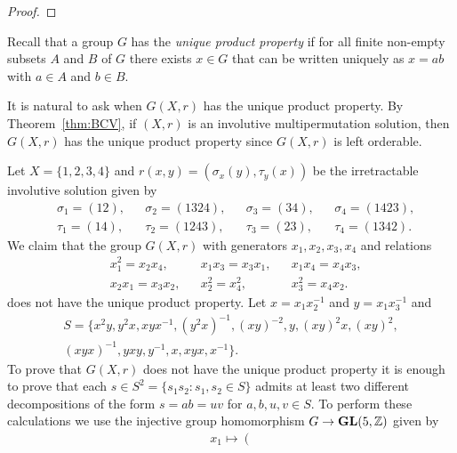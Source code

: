 \begin{proof}

\end{proof}

Recall that a group $G$ has the \emph{unique product property} if 
for all finite non-empty subsets $A$ and $B$ of $G$ there exists $x\in G$ 
that can be written uniquely as $x = ab$ with $a\in A$ and $b\in B$. 

It is natural to ask when $G(X,r)$ has the unique product property. By Theorem~\ref{thm:BCV}, if $(X,r)$ is an involutive
multipermutation solution, then $G(X,r)$ has the unique product property since $G(X,r)$ is left orderable. 

\begin{example}
    \label{pro:4-19}
	Let $X=\{1,2,3,4\}$ and $r(x,y)=(\sigma_x(y),\tau_y(x))$ be the irretractable involutive solution given by 
	\begin{align*}
		&\sigma_1=(12), && \sigma_2=(1324), && \sigma_3=(34), && \sigma_4=(1423),\\
		&\tau_1=(14), &&\tau_2=(1243), && \tau_3=(23), && \tau_4=(1342).
	\end{align*}
	We claim that the group $G(X,r)$ with 
	generators
	$x_1,x_2,x_3,x_4$ and relations
	\begin{align*}
		& x_1^2=x_2x_4,
		&& x_1x_3=x_3x_1,
		&& x_1x_4=x_4x_3,\\
		& x_2x_1=x_3x_2,
		&& x_2^2=x_4^2,
		&& x_3^2=x_4x_2.
	\end{align*}
	does not have the unique product property. Let $x=x_1x_2^{-1}$ and $y=x_1x_3^{-1}$ and 
    \begin{multline}
    \label{eq:Promislow}
    S=\{ x^2y,
    y^2x,
    xyx^{-1},
    (y^2x)^{-1},
    (xy)^{-2},
    y,
    (xy)^2x,
    (xy)^2,\\
    (xyx)^{-1},
    yxy,
    y^{-1},
    x,
    xyx, 
    x^{-1}
	\}.
    \end{multline}
    To prove that $G(X,r)$ does not have
    the unique product property it is enough to prove that 
    each $s\in S^2=\{s_1s_2:s_1,s_2\in S\}$ admits at least two different decompositions 
    of the form $s=ab=uv$ for $a,b,u,v\in S$. To perform these calculations we 
    use the injective group homomorphism $G\to\mathbf{GL}(5,\mathbb{Z})$ given by  
	\begin{align*}
	&x_1\mapsto\left(\begin{smallmatrix}

\end{smallmatrix}
\end{align*}
\end{example}
